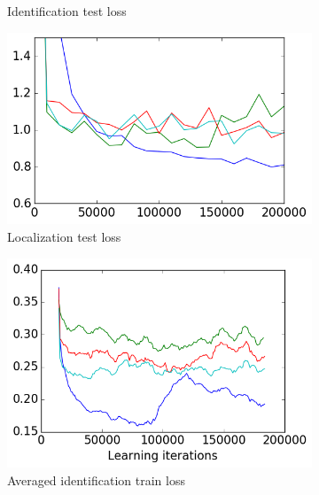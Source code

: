 \begin{figure}[htb]
\begin{subfigure}[t]{0.5\textwidth}
    \caption{Identification test loss}
	\label{fig:results:id_test_loss}
\end{subfigure}%
\begin{subfigure}[t]{0.5\textwidth}
	\centering
	\includegraphics[scale=0.45]{images-architecture-compare/loc_test_loss}
    \caption{Localization test loss}
	\label{fig:results:loc_test_loss}
\end{subfigure}
\begin{subfigure}[t]{0.5\textwidth}
	\centering
	\includegraphics[scale=0.45]{images-architecture-compare/id_train_loss}
    \caption{Averaged identification train loss}
	\label{fig:results:id_train_loss}
\end{subfigure}%
\begin{subfigure}[t]{0.45\textwidth}
	\centering

\end{subfigure}
\end{figure}
